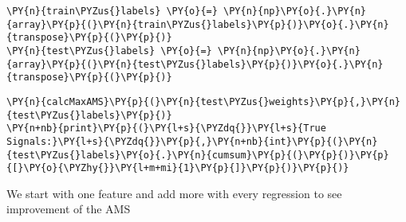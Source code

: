 
{\par%
\vspace{-1\baselineskip}%
}%
\begin{notebookcell}[]%
\begin{addmargin}[\cellleftmargin]{0em}%
{\smaller%
\par%
%
\vspace{-1\smallerfontscale}%
\begin{Verbatim}[commandchars=\\\{\}]
\PY{n}{train\PYZus{}labels} \PY{o}{=} \PY{n}{np}\PY{o}{.}\PY{n}{array}\PY{p}{(}\PY{n}{train\PYZus{}labels}\PY{p}{)}\PY{o}{.}\PY{n}{transpose}\PY{p}{(}\PY{p}{)}
\PY{n}{test\PYZus{}labels} \PY{o}{=} \PY{n}{np}\PY{o}{.}\PY{n}{array}\PY{p}{(}\PY{n}{test\PYZus{}labels}\PY{p}{)}\PY{o}{.}\PY{n}{transpose}\PY{p}{(}\PY{p}{)}
\end{Verbatim}
%
\par%
\vspace{-1\smallerfontscale}}%
\end{addmargin}
\end{notebookcell}



{\par%
\vspace{-1\baselineskip}%
}%
\begin{notebookcell}[]%
\begin{addmargin}[\cellleftmargin]{0em}%
{\smaller%
\par%
%
\vspace{-1\smallerfontscale}%
\begin{Verbatim}[commandchars=\\\{\}]
\PY{n}{calcMaxAMS}\PY{p}{(}\PY{n}{test\PYZus{}weights}\PY{p}{,}\PY{n}{test\PYZus{}labels}\PY{p}{)}
\PY{n+nb}{print}\PY{p}{(}\PY{l+s}{\PYZdq{}}\PY{l+s}{True Signals:}\PY{l+s}{\PYZdq{}}\PY{p}{,}\PY{n+nb}{int}\PY{p}{(}\PY{n}{test\PYZus{}labels}\PY{o}{.}\PY{n}{cumsum}\PY{p}{(}\PY{p}{)}\PY{p}{[}\PY{o}{\PYZhy{}}\PY{l+m+mi}{1}\PY{p}{]}\PY{p}{)}\PY{p}{)}
\end{Verbatim}
%
\par%
\vspace{-1\smallerfontscale}}%
\end{addmargin}
\end{notebookcell}


    We start with one feature and add more with every regression to see
improvement of the AMS

